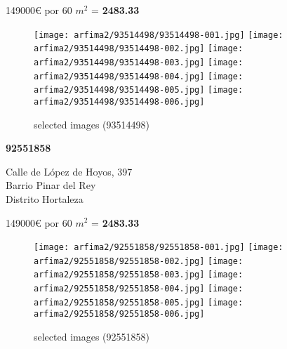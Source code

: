 \documentclass[10pt,a4paper]{report}
\begin{document}
{\large 149000€ por 60 $m^2$ = \color{blue} \textbf{2483.33}}
\begin{figure}[htbp]

\texttt{[image: arfima2/93514498/93514498-001.jpg]}
\texttt{[image: arfima2/93514498/93514498-002.jpg]}
\texttt{[image: arfima2/93514498/93514498-003.jpg]}
\texttt{[image: arfima2/93514498/93514498-004.jpg]}
\texttt{[image: arfima2/93514498/93514498-005.jpg]}
\texttt{[image: arfima2/93514498/93514498-006.jpg]}
\caption{selected images (93514498)}
\end{figure}
\newpage
\begin{center}
\begin{large}
\textbf{92551858}\\[10px]
\end{large}
Calle de López de Hoyos, 397\\
Barrio Pinar del Rey\\
Distrito Hortaleza\\
\end{center}
{\large 149000€ por 60 $m^2$ = \color{blue} \textbf{2483.33}}
\begin{figure}[htbp]

\texttt{[image: arfima2/92551858/92551858-001.jpg]}
\texttt{[image: arfima2/92551858/92551858-002.jpg]}
\texttt{[image: arfima2/92551858/92551858-003.jpg]}
\texttt{[image: arfima2/92551858/92551858-004.jpg]}
\texttt{[image: arfima2/92551858/92551858-005.jpg]}
\texttt{[image: arfima2/92551858/92551858-006.jpg]}
\caption{selected images (92551858)}
\end{figure}
\end{document}
